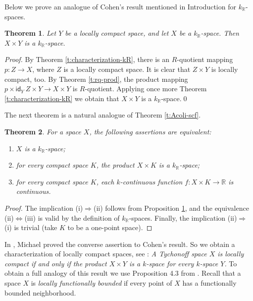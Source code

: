 \documentclass[preprint,11pt]{elsarticle}
\newtheorem{theorem}{Theorem}[section]
\numberwithin{equation}{section}
\numberwithin{theorem}{section}
\newcommand{\IR}{\mathbb{R}}
\newcommand{\Ra}{\Rightarrow}
\newcommand{\LRa}{\Leftrightarrow}
\newcommand{\Id}{\mathsf{id}}
\begin{document}
Below we prove an analogue of Cohen's result mentioned in Introduction  for $k_\IR$-spaces.

\begin{theorem} \label{p:lc-kR=kR}
Let $Y$ be a locally compact space, and let $X$ be a $k_\IR$-space. Then $X\times  Y$ is a $k_\IR$-space.
\end{theorem}
\begin{proof}
By Theorem \ref{t:characterization-kR},  there is an $R$-quotient mapping $p:Z\to X$, where $Z$ is  a locally compact space. It is clear that $Z\times Y$ is locally compact, too. By Theorem \ref{t:rq-prod}, the product mapping $p\times \Id_Y\: Z\times Y\to X\times Y$ is $R$-quotient. Applying once more Theorem  \ref{t:characterization-kR} we obtain that $X\times Y$ is a $k_\IR$-space.\qed
\end{proof}

The next theorem is a natural analogue of Theorem \ref{t:Acoli-scf}.
\begin{theorem} \label{t:kR-prod-compact}
For a space $X$, the following assertions are equivalent:
\begin{enumerate}
\item[{\rm(i)}] $X$ is a $k_\IR$-space;
\item[{\rm(ii)}] for every compact space $K$, the product $X\times K$ is a $k_\IR$-space;
\item[{\rm(iii)}] for every compact space $K$,  each $k$-continuous function $f:X\times K\to\IR$ is continuous.
\end{enumerate}
\end{theorem}

\begin{proof}
The implication (i)$\Ra$(ii) follows from Proposition \ref{p:lc-kR=kR}, and the equivalence (ii)$\LRa$(iii) is valid by the definition of $k_\IR$-spaces. Finally, the implication (ii)$\Ra$(i) is trivial (take $K$ to be a one-point space).
\end{proof}



In \cite{Michael-lc}, Michael proved the converse assertion to Cohen's result. So we obtain a characterization of locally compact spaces, see \cite[3.12.14(c)]{Eng}: {\em A Tychonoff space $X$ is locally compact if and only if the product $X\times Y$ is a $k$-space for every $k$-space $Y$.} To obtain a full analogy of this result we use Proposition 4.3 from \cite{Gabr-seq-Ascoli}. Recall that a space $X$ is {\em locally functionally bounded} if every point of $X$ has a functionally bounded neighborhood.
\end{document}
